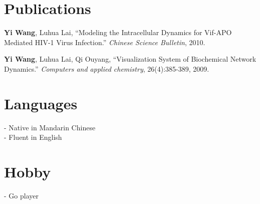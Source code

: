 \documentclass[margin,line]{resume}
\begin{document}
\begin{resume}
    \section{\mysidestyle Publications}

      \textbf{Yi Wang}, Luhua Lai, ``Modeling the Intracellular Dynamics for Vif-APO Mediated HIV-1 Virus Infection.''
      \textsl{Chinese Science Bulletin}, 2010.

      \textbf{Yi Wang}, Luhua Lai, Qi Ouyang, ``Visualization System of Biochemical Network Dynamics.''
      \textsl{Computers and applied chemistry}, 26(4):385-389, 2009.
      

    \section{\mysidestyle Languages}
      
      - Native in Mandarin Chinese \\
      - Fluent in English 


    \section{\mysidestyle Hobby} 
      
	- Go player

\end{resume}
\end{document}

